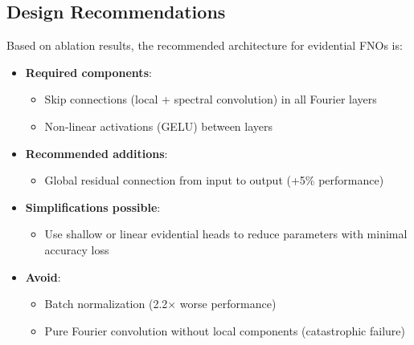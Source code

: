 \subsection{Design Recommendations}

Based on ablation results, the recommended architecture for evidential FNOs is:

\begin{itemize}
\item \textbf{Required components}:
\begin{itemize}
\item Skip connections (local + spectral convolution) in all Fourier layers
\item Non-linear activations (GELU) between layers
\end{itemize}

\item \textbf{Recommended additions}:
\begin{itemize}
\item Global residual connection from input to output (+5\% performance)
\end{itemize}

\item \textbf{Simplifications possible}:
\begin{itemize}
\item Use shallow or linear evidential heads to reduce parameters with minimal accuracy loss
\end{itemize}

\item \textbf{Avoid}:
\begin{itemize}
\item Batch normalization (2.2× worse performance)
\item Pure Fourier convolution without local components (catastrophic failure)
\end{itemize}
\end{itemize}